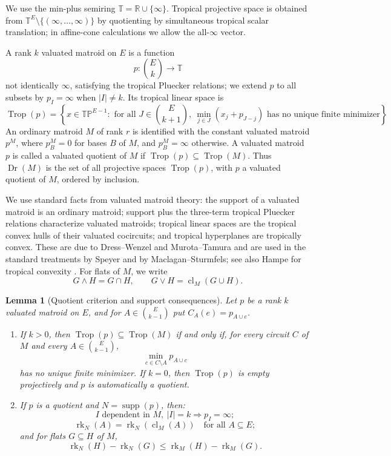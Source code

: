 \documentclass[12pt]{article}
\newtheorem{lemma}[theorem]{Lemma}
\theoremstyle{definition}
\newcommand{\T}{\mathbb T}
\newcommand{\TP}{\mathbb{TP}}
\newcommand{\Trop}{\operatorname{Trop}}
\newcommand{\Dr}{\operatorname{Dr}}
\newcommand{\rk}{\operatorname{rk}}
\newcommand{\cl}{\operatorname{cl}}
\newcommand{\supp}{\operatorname{supp}}
\newcommand{\binomE}[1]{\binom{E}{#1}}
\begin{document}
We use the min-plus semiring \(\T=\mathbb R\cup\{\infty\}\).  Tropical projective space is obtained from \(\T^E\setminus\{(\infty,\ldots,\infty)\}\) by quotienting by simultaneous tropical scalar translation; in affine-cone calculations we allow the all-\(\infty\) vector.

A rank \(k\) valuated matroid on \(E\) is a function
\[
p:\binom{E}{k}\to \T
\]
not identically \(\infty\), satisfying the tropical Pluecker relations; we extend \(p\) to all subsets by \(p_I=\infty\) when \(|I|\ne k\).  Its tropical linear space is
\[
\Trop(p)=
\left\{
x\in \TP^{E-1}:
\text{ for all }J\in\binomE{k+1},\ 
\min_{j\in J}(x_j+p_{J-j})\text{ has no unique finite minimizer}
\right\}.
\]
An ordinary matroid \(M\) of rank \(r\) is identified with the constant valuated matroid \(p^M\), where \(p^M_B=0\) for bases \(B\) of \(M\), and \(p^M_B=\infty\) otherwise.  A valuated matroid \(p\) is called a valuated quotient of \(M\) if \(\Trop(p)\subseteq \Trop(M)\).  Thus \(\Dr(M)\) is the set of all projective spaces \(\Trop(p)\), with \(p\) a valuated quotient of \(M\), ordered by inclusion.

We use standard facts from valuated matroid theory: the support of a valuated matroid is an ordinary matroid; support plus the three-term tropical Pluecker relations characterize valuated matroids; tropical linear spaces are the tropical convex hulls of their valuated cocircuits; and tropical hyperplanes are tropically convex.  These are due to Dress--Wenzel and Murota--Tamura and are used in the standard treatments by Speyer and by Maclagan--Sturmfels; see also Hampe for tropical convexity \cite{DW92,MT01,Speyer08,MS15,Hampe15}.  For flats of \(M\), we write
\[
G\wedge H=G\cap H,\qquad G\vee H=\cl_M(G\cup H).
\]

\begin{lemma}[Quotient criterion and support consequences]\label{lem:quotient}
Let \(p\) be a rank \(k\) valuated matroid on \(E\), and for \(A\in\binomE{k-1}\) put \(C_A(e)=p_{A\cup e}\).
\begin{enumerate}
\item If \(k>0\), then \(\Trop(p)\subseteq \Trop(M)\) if and only if, for every circuit \(C\) of \(M\) and every \(A\in\binomE{k-1}\),
\[
\min_{c\in C\setminus A}p_{A\cup c}
\]
has no unique finite minimizer.  If \(k=0\), then \(\Trop(p)\) is empty projectively and \(p\) is automatically a quotient.
\item If \(p\) is a quotient and \(N=\supp(p)\), then:
\[
I\text{ dependent in }M,\ |I|=k \Longrightarrow p_I=\infty;
\]
\[
\rk_N(A)=\rk_N(\cl_M(A))\quad\text{for all }A\subseteq E;
\]
and for flats \(G\subseteq H\) of \(M\),
\[
\rk_N(H)-\rk_N(G)\le \rk_M(H)-\rk_M(G).
\]
\end{enumerate}
\end{lemma}
\end{document}

